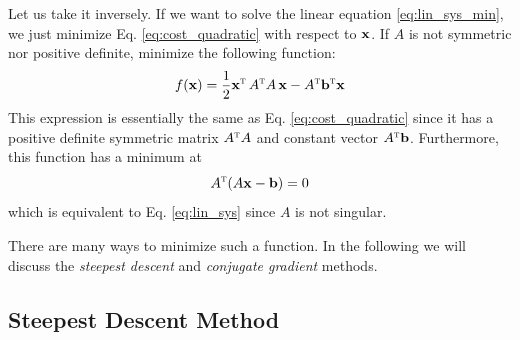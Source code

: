Let us take it inversely. If we want to solve the linear equation \eqref{eq:lin_sys_min}, we just minimize Eq. \eqref{eq:cost_quadratic} with respect to $\vb{x}$.
If $A$ is not symmetric nor positive definite, minimize the following function:
\begin{equation}\label{eq:cost_quadratic2}
f(\vb{x}) = \frac{1}{2} \vb{x}^\textsc{t}\, A^\textsc{t} A \, \vb{x} - A^\textsc{t} \vb{b}^\textsc{t} \vb{x}
\end{equation}
This expression is essentially the same as Eq. \eqref{eq:cost_quadratic} since it has a positive definite symmetric matrix $A^\textsc{t} A$ and constant vector $A^\textsc{t} \vb{b}$. Furthermore, this function has a minimum at
\begin{equation}
A^\textsc{t} (A \vb{x} - \vb{b}) = 0
\end{equation}
which is equivalent to Eq. \eqref{eq:lin_sys} since $A$ is not singular.

There are many ways to minimize such a function.  In the following we will discuss the \textit{steepest descent} and \textit{conjugate gradient} methods.

\subsection{Steepest Descent Method}

